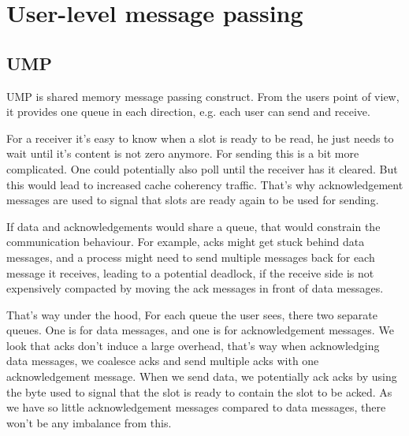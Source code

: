 \chapter{User-level message passing}

\section{UMP}

UMP is shared memory message passing construct.
From the users point of view, it provides one queue in each direction, e.g. each
user can send and receive.

For a receiver it's easy to know when a slot is ready to be read, he just needs
to wait until it's content is not zero anymore.
For sending this is a bit more complicated.
One could potentially also poll until the receiver has it cleared.
But this would lead to increased cache coherency traffic.
That's why acknowledgement messages are used to signal that slots are ready
again to be used for sending.

If data and acknowledgements would share a queue, that would constrain the
communication behaviour.
For example, acks might get stuck behind data messages, and a process might need
to send multiple messages back for each message it receives, leading to a
potential deadlock, if the receive side is not expensively compacted by moving
the ack messages in front of data messages.

That's way under the hood, For each queue the user sees, there two separate
queues.
One is for data messages, and one is for acknowledgement messages.
We look that acks don't induce a large overhead, that's way when acknowledging
data messages, we coalesce acks and send multiple acks with one acknowledgement
message.
When we send data, we potentially ack acks by using
the byte used to signal that the slot is ready to contain the slot to be acked.
As we have so little acknowledgement messages compared to data messages, there
won't be any imbalance from this.

